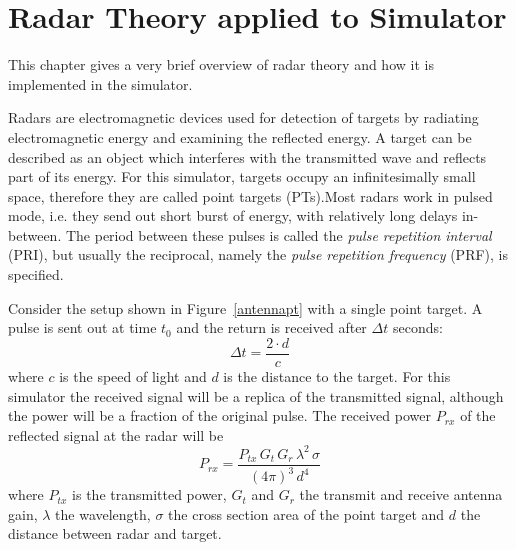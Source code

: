                       

\chapter{Radar Theory applied to Simulator\label{chap:theory}}

This chapter gives a very brief overview of radar theory and how it is
implemented in the simulator.

Radars are electromagnetic devices used for detection of targets by
radiating electromagnetic energy and examining the reflected energy. A
target can be described as an object which interferes with the transmitted
wave and reflects part of its energy. For this simulator, targets occupy an
infinitesimally small space, therefore they are called point targets
(PTs).Most radars work in pulsed mode, i.e. they send out short burst of
energy, with relatively long delays in-between. The period between these
pulses is called the \textit{pulse repetition interval} (PRI), but usually
the reciprocal, namely the \textit{pulse repetition frequency }(PRF), is
specified.


Consider the setup shown in Figure~\ref{antennapt} with a single point
target. A pulse is sent out at time $t_{0}$ and the return is received after 
$\Delta t$ seconds: 
\begin{equation}
\Delta t=\frac{2\cdot d}{c}  \label{equ:delta_t}
\end{equation}
where $c$ is the speed of light and $d$ is the distance to the target. For
this simulator the received signal will be a replica of the transmitted
signal, although the power will be a fraction of the original pulse. The
received power $P_{rx}$ of the reflected signal at the radar will be 
\begin{equation}
P_{rx}=\frac{P_{tx}\,G_{t}\,G_{r}\,\lambda ^{2}\,\sigma }{\left( 4\pi
\right) ^{3}\,d^{4}}
\end{equation}
where $P_{tx}$ is the transmitted power, $G_{t}$ and $G_{r}$ the transmit
and receive antenna gain, $\lambda $ the wavelength, $\sigma $ the cross
section area of the point target and $d$ the distance between radar and
target.

